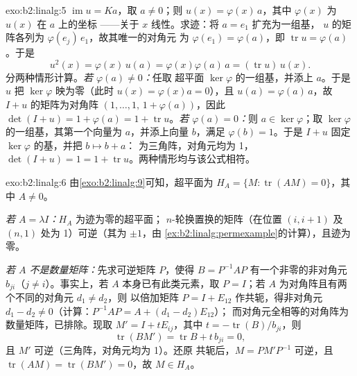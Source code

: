 \begin{solution}{exo:b2:linalg:5}
$\operatorname{im} u = Ka$，取 $a \neq 0$；则 $u(x) =
\varphi(x)\,a$，其中 $\varphi(x)$ 为 $u(x)$ 在 $a$ 上的坐标
——关于 $x$ 线性。求迹：将 $a = e_1$ 扩充为一组基，
$u$ 的矩阵各列为 $\varphi(e_j)\,e_1$，故其唯一的对角元
为 $\varphi(e_1) = \varphi(a)$，即 $\operatorname{tr} u =
\varphi(a)$。于是
\[
u^2(x) = \varphi(x)\, u(a) = \varphi(x)\varphi(a)\, a
= (\operatorname{tr} u)\, u(x).
\]
分两种情形计算。\emph{若 $\varphi(a) \neq 0$：}任取
超平面 $\ker\varphi$ 的一组基，并添上 $a$。于是 $u$ 把
$\ker\varphi$ 映为零（此时 $u(x) = \varphi(x)a = 0$），且 $u(a) =
\varphi(a)\,a$，故 $I + u$ 的矩阵为对角阵 $(1, \dots, 1,\,
1 + \varphi(a))$，因此 $\det(I + u) = 1 + \varphi(a) = 1 +
\operatorname{tr} u$。\emph{若 $\varphi(a) = 0$：}则 $a \in
\ker\varphi$；取 $\ker\varphi$ 的一组基，其第一个向量为
$a$，并添上向量 $b$，满足 $\varphi(b) = 1$。于是 $I + u$
固定 $\ker\varphi$ 的基，并把 $b \mapsto b + a$：
为三角阵，对角元均为 1，$\det(I + u) = 1 = 1 +
\operatorname{tr} u$。两种情形均与该公式相符。
\end{solution}

\begin{solution}{exo:b2:linalg:6}
由\cref{exo:b2:linalg:9}可知，超平面为 $H_A = \{M :
\operatorname{tr}(AM) = 0\}$，其中 $A \neq 0$。

\emph{若 $A = \lambda I$：}$H_A$ 为迹为零的超平面；
$n$-轮换置换的矩阵（在位置 $(i, i+1)$
及 $(n, 1)$ 处为 1）可逆（其为 $\pm 1$，由
\cref{ex:b2:linalg:permexample}的计算），且迹为零。

\emph{若 $A$ 不是数量矩阵：}先求可逆矩阵 $P$，使得
$B = P^{-1}AP$ 有一个非零的非对角元 $b_{ji}$（$j \neq
i$）。事实上，若 $A$ 本身已有此类元素，取 $P = I$；若 $A$
为对角阵且有两个不同的对角元 $d_1 \neq d_2$，则
以倍加矩阵 $P = I + E_{12}$ 作共轭，得非对角元
$d_1 - d_2 \neq 0$（计算：$P^{-1}AP = A + (d_1 - d_2)E_{12}$）；
而对角元全相等的对角阵为
数量矩阵，已排除。现取 $M' = I + tE_{ij}$，其中 $t =
-\operatorname{tr}(B)/b_{ji}$，则
\[
\operatorname{tr}(BM') = \operatorname{tr} B + t\,b_{ji} = 0,
\]
且 $M'$ 可逆（三角阵，对角元均为 1）。还原
共轭后，$M = PM'P^{-1}$ 可逆，且
$\operatorname{tr}(AM) = \operatorname{tr}(BM') = 0$，故 $M \in H_A$。
\end{solution}

